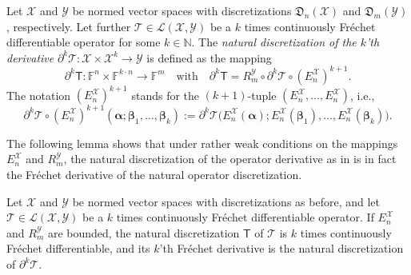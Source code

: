 \documentclass[a4paper]{paper}
\newcommand{\Discr}{\mathfrak{D}}
\newcommand{\Spc}[1]{\mathscr{#1}}
\newcommand{\Field}{\mathbb{F}}
\newcommand{\Natural}{\mathbb{N}}
\newcommand{\Op}[1]{\mathcal{#1}}
\newcommand{\DiscOp}[1]{\mathsf{#1}}
\newcommand*{\EXT}[2]{\ensuremath{E_{#1}^{#2}}}
\newcommand*{\REST}[2]{\ensuremath{R_{#1}^{#2}}}
\newcommand*{\RmY}{\ensuremath{\REST{m}{\Spc{Y}}}}
\newcommand*{\EnX}{\ensuremath{\EXT{n}{\Spc{X}}}}
\newcommand{\valpha}{\boldsymbol{\alpha}}
\newcommand{\vbeta}{\boldsymbol{\beta}}
\begin{document}
\begin{definition}
 \label{def:discr:operator:op_deriv:operator_deriv_discr}
 Let $\Spc{X}$ and $\Spc{Y}$ be normed vector spaces with discretizations $\Discr_n(\Spc{X})$ and $\Discr_m(\Spc{Y})$, 
 respectively. Let further $\Op{T} \in \Spc{L}(\Spc{X}, \Spc{Y})$ be a $k$ times continuously Fr\'{e}chet 
 differentiable operator for some $k \in  \Natural$. The \emph{natural discretization of the $k$'th derivative} 
 $\partial^k \Op{T} \colon \Spc{X} \times \Spc{X}^k \to \Spc{Y}$ is defined as the mapping
 \begin{equation*}
  \partial^k \DiscOp{T} \colon \Field^n \times \Field^{k\cdot n} \to \Field^m
  \quad \text{with} \quad
  \partial^k \DiscOp{T} = \RmY \circ \partial^k \Op{T} \circ (\EnX)^{k+1}.
 \end{equation*}
 The notation $(\EnX)^{k+1}$ stands for the $(k+1)$-tuple $(\EnX, \ldots, \EnX)$, i.e., 
 \begin{equation*}
  \partial^k \Op{T} \circ (\EnX)^{k+1}(\valpha; \vbeta_1, \ldots, \vbeta_k) :=
 \partial^k \Op{T}\big( \EnX(\valpha); \EnX(\vbeta_1), \ldots, \EnX(\vbeta_k) \big).
 \end{equation*}
\end{definition}


The following lemma shows that under rather weak conditions on the mappings $E_n^{\Spc{X}}$ and $R_m^{\Spc{Y}}$, the 
natural discretization of the operator derivative as in  is in 
fact the Fr\'{e}chet derivative of the natural operator discretization.

\begin{lemma}
 \label{lemma:discr:operator:op_deriv:natural_is_deriv}
 Let $\Spc{X}$ and $\Spc{Y}$ be normed vector spaces with discretizations as before, and let 
 $\Op{T} \in \Spc{L}(\Spc{X}, \Spc{Y})$ be a $k$ times continuously Fr\'{e}chet differentiable 
 operator. If $E_n^{\Spc{X}}$ and $R_m^{\Spc{Y}}$ are bounded, the natural discretization $\DiscOp{T}$ of $\Op{T}$ is 
 $k$ times  continuously Fr\'{e}chet differentiable, and its $k$'th Fr\'{e}chet derivative is the natural 
 discretization of $\partial^k\Op{T}$.
\end{lemma}
\end{document}
